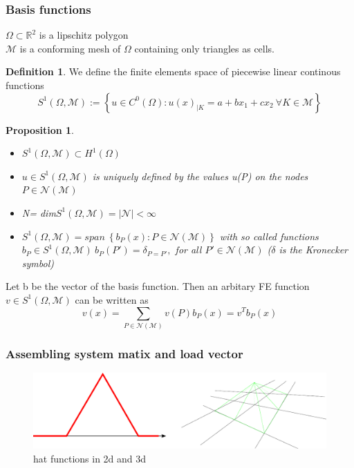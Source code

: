 \documentclass[english]{article}
\newtheorem*{prop}{Proposition}
\theoremstyle{definition}
\newtheorem*{defi}{Definition}
\theoremstyle{remark}
\newcommand{\M}{\mathcal{M}}
\newcommand{\N}{\mathcal{N}}
\newcommand{\RR}{\mathbb{R}}			%
\newcommand{\dd}{\delta}				%
\newcommand{\OO}{\Omega}
\begin{document}
\subsubsection{Basis functions}
$\OO\subset \RR^2$ is a lipschitz polygon\\
$\M$ is a conforming mesh of $\OO$ containing only triangles as cells.
\begin{defi} We define  the finite elements space of piecewise linear continous functions
  $$S^1 (\OO,\M) := \left\{u \in C^0 (\OO) : u(x)_{|K} = a+bx_1+cx_2 \ \forall K \in \M\right\}$$
\end{defi}
\begin{prop}
  \begin{itemize}
  \item $S^1 (\OO,\M) \subset H^1(\OO)$
  \item $u \in S^1(\OO,\M) $ is uniquely defined by the values u(P) on the nodes $P \in \N(\M)$
  \item N= dim$ S^1(\OO,\M) = |\N | <\infty$
  \item $S^1(\OO,\M) = span\ \left\{b_P(x) : P\in \N(\M) \right\} $ with so called functions $b_P \in S^1(\OO,\M) \ b_P(P') = \dd_{P=P'}, $ for all $P'\in \N(\M)$ ($\dd$ is the Kronecker symbol)
  \end{itemize}
\end{prop}
Let b be the vector of the basis function. Then an arbitary FE function $v \in  S^1(\OO,\M)$ can be written as 
$$v(x) = \sum_{P \in \N(\M)} v(P) b_P(x) = v^T b_P(x)$$
\subsubsection{Assembling system matix and load vector}
\begin{figure}[H]
  \begin{center}
    \includegraphics[width=\textwidth]{figs/hatFunction.pdf}
  \end{center}
  \caption{hat functions in 2d and 3d}
  \label{hat-functions-figure}
\end{figure}
\end{document}
